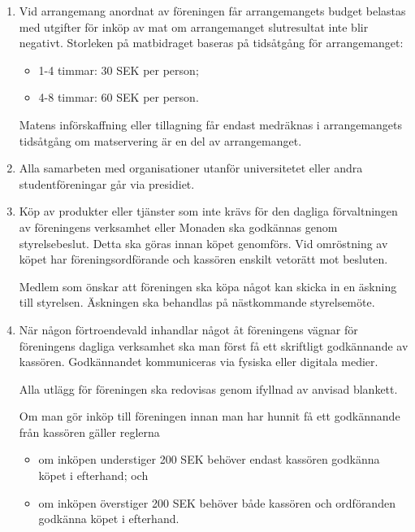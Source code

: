 \documentclass{dvd}
\begin{document}
\begin{enumerate}[label=\arabic* §, ref=\arabic*]
		\item Vid arrangemang anordnat av föreningen får arrangemangets budget belastas med utgifter för inköp av mat om arrangemanget slutresultat inte blir negativt.
		Storleken på matbidraget baseras på tidsåtgång för arrangemanget:

		\begin{itemize}
		\item 1-4 timmar: 30 SEK per person;

		\item 4-8 timmar: 60 SEK per person.
		\end{itemize}

		Matens införskaffning eller tillagning får endast medräknas i arrangemangets tidsåtgång om matservering är en del av arrangemanget.

		\item Alla samarbeten med organisationer utanför universitetet eller andra studentföreningar går via presidiet.

		\item Köp av produkter eller tjänster som inte krävs för den dagliga förvaltningen av föreningens verksamhet eller Monaden ska godkännas genom styrelsebeslut.
		Detta ska göras innan köpet genomförs.
		Vid omröstning av köpet har föreningsordförande och kassören enskilt vetorätt mot besluten.

		Medlem som önskar att föreningen ska köpa något kan skicka in en äskning till styrelsen.
		Äskningen ska behandlas på nästkommande styrelsemöte.

		\item När någon förtroendevald inhandlar något åt föreningens vägnar för föreningens dagliga verksamhet ska man först få ett skriftligt godkännande av kassören.
		Godkännandet kommuniceras via fysiska eller digitala medier.

		Alla utlägg för föreningen ska redovisas genom ifyllnad av anvisad blankett.

		Om man gör inköp till föreningen innan man har hunnit få ett godkännande från kassören gäller reglerna

		\begin{itemize}
		\item om inköpen understiger 200 SEK behöver endast kassören godkänna köpet i efterhand; och

		\item om inköpen överstiger 200 SEK behöver både kassören och ordföranden godkänna köpet i efterhand.
		\end{itemize}
	\end{enumerate}
\end{document}
